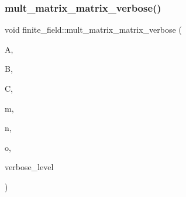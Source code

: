 \mbox{\label{classfinite__field_ae4a5144937f698102d44f89de51a6a8d}} 
\subsubsection{\texorpdfstring{mult\+\_\+matrix\+\_\+matrix\+\_\+verbose()}{mult\_matrix\_matrix\_verbose()}}
{\footnotesize\ttfamily void finite\+\_\+field\+::mult\+\_\+matrix\+\_\+matrix\+\_\+verbose (\begin{DoxyParamCaption}\item[{\mbox{\hyperlink{galois_8h_a09fddde158a3a20bd2dcadb609de11dc}{I\+NT}} $\ast$}]{A,  }\item[{\mbox{\hyperlink{galois_8h_a09fddde158a3a20bd2dcadb609de11dc}{I\+NT}} $\ast$}]{B,  }\item[{\mbox{\hyperlink{galois_8h_a09fddde158a3a20bd2dcadb609de11dc}{I\+NT}} $\ast$}]{C,  }\item[{\mbox{\hyperlink{galois_8h_a09fddde158a3a20bd2dcadb609de11dc}{I\+NT}}}]{m,  }\item[{\mbox{\hyperlink{galois_8h_a09fddde158a3a20bd2dcadb609de11dc}{I\+NT}}}]{n,  }\item[{\mbox{\hyperlink{galois_8h_a09fddde158a3a20bd2dcadb609de11dc}{I\+NT}}}]{o,  }\item[{\mbox{\hyperlink{galois_8h_a09fddde158a3a20bd2dcadb609de11dc}{I\+NT}}}]{verbose\+\_\+level }\end{DoxyParamCaption})}

\mbox{\label{classfinite__field_aad2078020fd058c71649f0a25a4c77cc}} 
